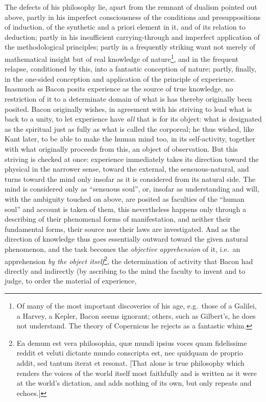 The defects of his philosophy lie, apart from the remnant of dualism pointed out above, partly in his imperfect consciousness of the conditions and presuppositions of induction, of the synthetic and a priori element in it, and of its relation to deduction; partly in his insufficient carrying-through and imperfect application of the methodological principles; partly in a frequently striking want not merely of mathematical insight but of real knowledge of nature\footnote{Of many of the most important discoveries of his age, e.g.\ those of a Galilei, a Harvey, a Kepler, Bacon seems ignorant; others, such as Gilbert's, he does not understand. The theory of Copernicus he rejects as a fantastic whim.}, and in the frequent relapse, conditioned by this, into a fantastic conception of nature;
partly, finally, in the one-sided conception and application of the principle of experience. Inasmuch as Bacon posits experience as the source of true knowledge, no restriction of it to a determinate domain of what is has thereby originally been posited. Bacon originally wishes, in agreement with his striving to lead what is back to a unity, to let experience have \emph{all} that is for its object: what is designated as the spiritual just as fully as what is called the corporeal; \setcounter{footnote}{0}he thus wished, like Kant later, to be able to make the human mind too, in its self-activity, together with what originally proceeds from this, an object of observation. But this striving is checked at once: experience immediately takes its direction toward the physical in the narrower sense, toward the external, the sensuous-natural, and turns toward the mind only insofar as it is considered from its natural side. The mind is considered only as ``sensuous soul'', or, insofar as understanding and will, with the ambiguity touched on above, are posited as faculties of the ``human soul'' and account is taken of them, this nevertheless happens only through a describing of their phenomenal forms of manifestation, and neither their fundamental forms, their source nor their laws are investigated. And as the direction of knowledge
thus goes essentially outward toward the given natural phenomenon, and the task becomes the \emph{objective apprehension} of it, i.e.\ an apprehension \emph{by the object itself}\footnote{Ea demum est vera philosophia, quæ mundi ipsius voces quam fidelissime reddit et veluti dictante mundo conscripta est, nec quidquam de proprio addit, sed tantum iterat et resonat. [That alone is true philosophy which renders the voices of the world itself most faithfully and is written as it were at the world's dictation, and adds nothing of its own, but only repeats and echoes.]}, the determination of activity that Bacon had directly and indirectly (by ascribing to the mind the faculty to invent and to judge, to order the material of experience,

